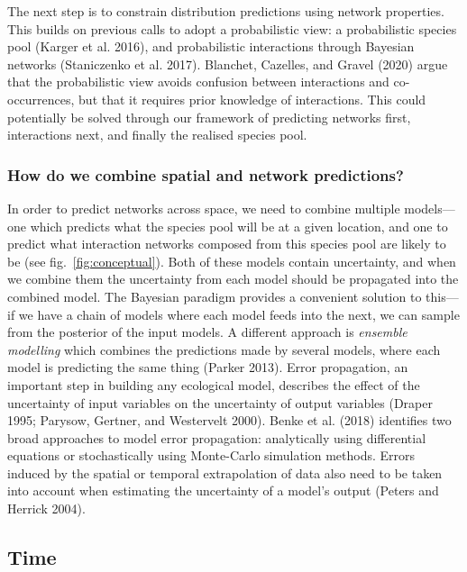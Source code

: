 \documentclass[10pt,oneside]{article}
\begin{document}
The next step is to constrain distribution predictions using network
properties. This builds on previous calls to adopt a probabilistic view:
a probabilistic species pool (Karger et al. 2016), and probabilistic
interactions through Bayesian networks (Staniczenko et al. 2017).
Blanchet, Cazelles, and Gravel (2020) argue that the probabilistic view
avoids confusion between interactions and co-occurrences, but that it
requires prior knowledge of interactions. This could potentially be
solved through our framework of predicting networks first, interactions
next, and finally the realised species pool.

\hypertarget{how-do-we-combine-spatial-and-network-predictions}{%
\subsubsection{How do we combine spatial and network
predictions?}\label{how-do-we-combine-spatial-and-network-predictions}}

In order to predict networks across space, we need to combine multiple
models---one which predicts what the species pool will be at a given
location, and one to predict what interaction networks composed from
this species pool are likely to be (see fig.~\ref{fig:conceptual}). Both
of these models contain uncertainty, and when we combine them the
uncertainty from each model should be propagated into the combined
model. The Bayesian paradigm provides a convenient solution to this---if
we have a chain of models where each model feeds into the next, we can
sample from the posterior of the input models. A different approach is
\emph{ensemble modelling} which combines the predictions made by several
models, where each model is predicting the same thing (Parker 2013).
Error propagation, an important step in building any ecological model,
describes the effect of the uncertainty of input variables on the
uncertainty of output variables (Draper 1995; Parysow, Gertner, and
Westervelt 2000). Benke et al. (2018) identifies two broad approaches to
model error propagation: analytically using differential equations or
stochastically using Monte-Carlo simulation methods. Errors induced by
the spatial or temporal extrapolation of data also need to be taken into
account when estimating the uncertainty of a model's output (Peters and
Herrick 2004).

\hypertarget{time}{%
\subsection{Time}\label{time}}
\end{document}
